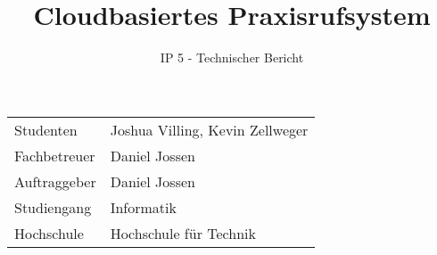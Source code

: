 \documentclass[final]{fhnwreport}
\title{Cloudbasiertes Praxisrufsystem}  %
\author{IP 5 - Technischer Bericht}                      %
\begin{document}
    \maketitle

    \vspace*{\fill}

    \begin{center}
        \renewcommand\arraystretch{2}
        \begin{tabular}{l l}
            Studenten & Joshua Villing, Kevin Zellweger\\
            Fachbetreuer & Daniel Jossen\\
            Auftraggeber & Daniel Jossen\\
            Studiengang & Informatik\\
            Hochschule & Hochschule für Technik
        \end{tabular}
    \end{center}

    \clearpage


    

    \setcounter{tocdepth}{2}
    \tableofcontents
    \clearpage

    
    
    
    
    
    
    


    
\end{document}
